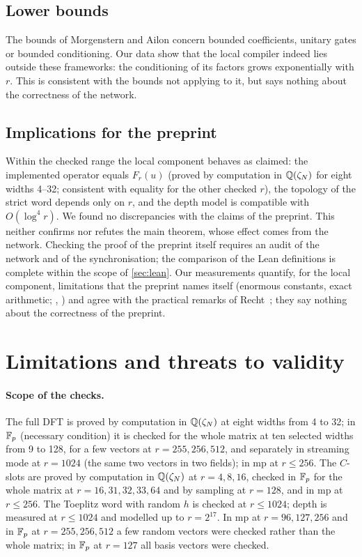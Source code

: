 \documentclass[11pt]{article}
\theoremstyle{plain}
\begin{document}
\subsection{Lower bounds}
The bounds of Morgenstern and Ailon concern bounded coefficients, unitary gates or bounded conditioning. Our data show that the local compiler indeed lies outside these frameworks: the conditioning of its factors grows exponentially with $r$. This is consistent with the bounds not applying to it, but says nothing about the correctness of the network.

\subsection{Implications for the preprint}\label{sec:implications}
Within the checked range the local component behaves as claimed: the implemented operator equals $F_r(u)$ (proved by computation in $\mathbb{Q}(\zeta_N)$ for eight widths 4--32; consistent with equality for the other checked $r$), the topology of the strict word depends only on $r$, and the depth model is compatible with $O(\log^4 r)$. We found no discrepancies with the claims of the preprint. This neither confirms nor refutes the main theorem, whose effect comes from the network. Checking the proof of the preprint itself requires an audit of the network and of the synchronisation; the comparison of the Lean definitions is complete within the scope of \cref{sec:lean}. Our measurements quantify, for the local component, limitations that the preprint names itself (enormous constants, exact arithmetic; , ) and agree with the practical remarks of Recht~\citep{recht2026}; they say nothing about the correctness of the preprint.

\section{Limitations and threats to validity}\label{sec:limitations}

\paragraph{Scope of the checks.}
The full DFT is proved by computation in $\mathbb{Q}(\zeta_N)$ at eight widths from 4 to 32; in $\mathbb{F}_p$ (necessary condition) it is checked for the whole matrix at ten selected widths from 9 to 128, for a few vectors at $r=255,256,512$, and separately in streaming mode at $r=1024$ (the same two vectors in two fields); in mp at $r\le256$. The $C$-slots are proved by computation in $\mathbb{Q}(\zeta_N)$ at $r=4,8,16$, checked in $\mathbb{F}_p$ for the whole matrix at $r=16,31,32,33,64$ and by sampling at $r=128$, and in mp at $r\le256$. The Toeplitz word with random $h$ is checked at $r\le1024$; depth is measured at $r\le1024$ and modelled up to $r=2^{17}$. In mp at $r=96,127,256$ and in $\mathbb{F}_p$ at $r=255,256,512$ a few random vectors were checked rather than the whole matrix; in $\mathbb{F}_p$ at $r=127$ all basis vectors were checked.
\end{document}
